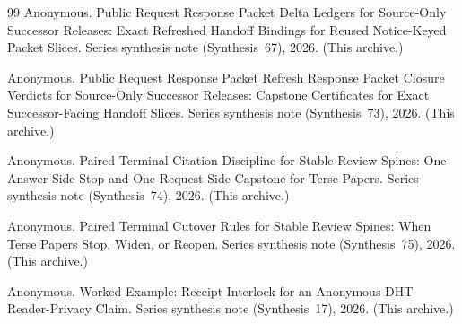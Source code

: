 \documentclass[11pt]{article}
\begin{document}
\begin{thebibliography}{99}
Anonymous.
\newblock Public Request Response Packet Delta Ledgers for Source-Only Successor Releases: Exact Refreshed Handoff Bindings for Reused Notice-Keyed Packet Slices.
\newblock Series synthesis note (Synthesis~67), 2026. (This archive.)

Anonymous.
\newblock Public Request Response Packet Refresh Response Packet Closure Verdicts for Source-Only Successor Releases: Capstone Certificates for Exact Successor-Facing Handoff Slices.
\newblock Series synthesis note (Synthesis~73), 2026. (This archive.)

Anonymous.
\newblock Paired Terminal Citation Discipline for Stable Review Spines: One Answer-Side Stop and One Request-Side Capstone for Terse Papers.
\newblock Series synthesis note (Synthesis~74), 2026. (This archive.)

Anonymous.
\newblock Paired Terminal Cutover Rules for Stable Review Spines: When Terse Papers Stop, Widen, or Reopen.
\newblock Series synthesis note (Synthesis~75), 2026. (This archive.)

Anonymous.
\newblock Worked Example: Receipt Interlock for an Anonymous-DHT Reader-Privacy Claim.
\newblock Series synthesis note (Synthesis~17), 2026. (This archive.)

\end{thebibliography}
\end{document}
